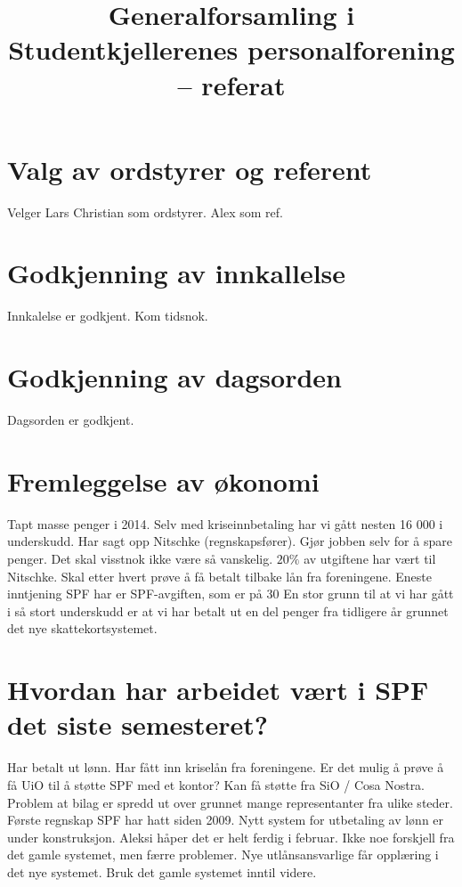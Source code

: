 \documentclass{article}[12pt]
\begin{document}
\title{Generalforsamling i Studentkjellerenes personalforening -- referat}
\date{}
\maketitle

  \section{Valg av ordstyrer og referent}
    Velger Lars Christian som ordstyrer. Alex som ref.

  \section{Godkjenning av innkallelse}
    Innkalelse er godkjent. Kom tidsnok.

  \section{Godkjenning av dagsorden}
    Dagsorden er godkjent.

  \section{Fremleggelse av økonomi}
    Tapt masse penger i 2014. Selv med kriseinnbetaling
    har vi gått nesten 16 000 i underskudd.
    Har sagt opp Nitschke (regnskapsfører).
    Gjør jobben selv for å spare penger.
    Det skal visstnok ikke være så vanskelig.
    $20 \%$ av utgiftene har vært til Nitschke.
    Skal etter hvert prøve å få betalt tilbake lån fra foreningene.
    Eneste inntjening SPF har er SPF-avgiften, som er på 30 %
    En stor grunn til at vi har gått i så stort underskudd
    er at vi har betalt ut en del penger fra tidligere år
    grunnet det nye skattekortsystemet.

  \section{Hvordan har arbeidet vært i SPF det siste semesteret?}
    Har betalt ut lønn. Har fått inn kriselån fra foreningene.
    Er det mulig å prøve å få UiO til å støtte SPF
    med et kontor? Kan få støtte fra SiO / Cosa Nostra.
    Problem at bilag er spredd ut over grunnet mange representanter
    fra ulike steder.
    Første regnskap SPF har hatt siden 2009.
    Nytt system for utbetaling av lønn er under konstruksjon.
    Aleksi håper det er helt ferdig i februar.
    Ikke noe forskjell fra det gamle systemet,
    men færre problemer.
    Nye utlånsansvarlige får opplæring i det nye systemet.
    Bruk det gamle systemet inntil videre.
\end{document}
